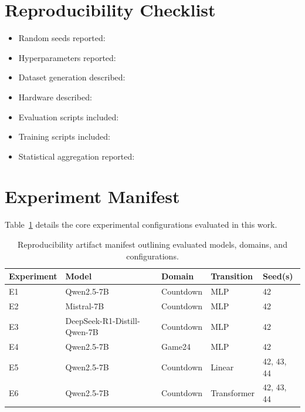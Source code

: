 \appendix

\section{Reproducibility Checklist}

\begin{itemize}
    \item Random seeds reported: \checkmark
    \item Hyperparameters reported: \checkmark
    \item Dataset generation described: \checkmark
    \item Hardware described: \checkmark
    \item Evaluation scripts included: \checkmark
    \item Training scripts included: \checkmark
    \item Statistical aggregation reported: \checkmark
\end{itemize}

\section{Experiment Manifest}

Table~\ref{tab:manifest} details the core experimental configurations evaluated in this work.

\begin{table}[h]
\centering
\begin{tabular}{llllp{3cm}}
\toprule
\textbf{Experiment} & \textbf{Model} & \textbf{Domain} & \textbf{Transition} & \textbf{Seed(s)} \\
\midrule
E1 & Qwen2.5-7B & Countdown & MLP & 42 \\
E2 & Mistral-7B & Countdown & MLP & 42 \\
E3 & DeepSeek-R1-Distill-Qwen-7B & Countdown & MLP & 42 \\
E4 & Qwen2.5-7B & Game24 & MLP & 42 \\
E5 & Qwen2.5-7B & Countdown & Linear & 42, 43, 44 \\
E6 & Qwen2.5-7B & Countdown & Transformer & 42, 43, 44 \\
\bottomrule
\end{tabular}
\caption{Reproducibility artifact manifest outlining evaluated models, domains, and configurations.}
\label{tab:manifest}
\end{table}
